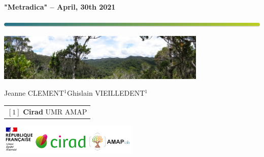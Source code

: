 
{
  \begin{frame}
  \begin{center}
  \small{\textbf{"Metradica" -- April, 30th 2021}}
  \end{center}
  \vspace{-0.5cm}
  \titlepage %
  \vspace{-3cm}
  \begin{center}
    \includegraphics[width=\textwidth]{figs/Barre_couleur}
    
    \vspace{0.25cm}
    
    \includegraphics[width=10cm]{figs/Banniere}
    
    \small{Jeanne CLEMENT$^{1}$\hspace{0.25cm}Ghislain VIEILLEDENT$^{1}$}
      
    \vspace{0.25cm}
    
    {\scriptsize
      \begin{tabular}{l}
        $[1]$ \textbf{Cirad} UMR AMAP
      \end{tabular}
    }
    
    \includegraphics[width=0.5\textwidth]{figs/partners_logos}
    
  \end{center}
  \end{frame}
}


